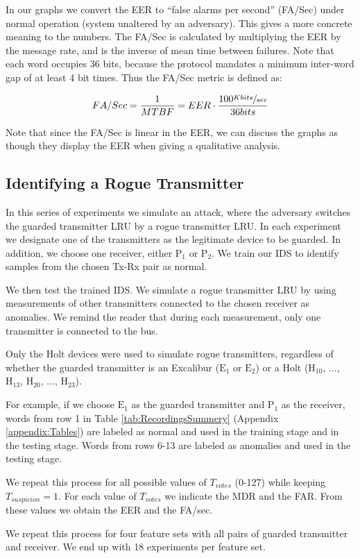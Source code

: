\documentclass[english]{llncs}
\newcommand{\sublevel}[1]{\subsection{#1}}
\newcommand{\sublevel}[1]{\section{#1}}
\begin{document}
  In our graphs we convert the EER to ``false alarms per second'' (FA/Sec) under normal operation (system unaltered by an adversary). This gives a more concrete meaning to the numbers. The FA/Sec is calculated by multiplying the EER by the message rate, and is the inverse of mean time between failures. Note that each word occupies 36 bits, because the protocol mandates a minimum inter-word gap of at least 4 bit times. Thus the FA/Sec metric is defined as:
  
  \[FA/Sec = \frac{1}{MTBF} = EER \cdot \frac{100 \sfrac{Kbits}{sec}}{36bits}\]
  
  Note that since the FA/Sec is linear in the EER, we can discuss the graphs as though they display the EER when giving a qualitative analysis.
  
\sublevel{Identifying a Rogue Transmitter}
  In this series of experiments we simulate an attack, where the adversary switches the guarded transmitter LRU by a rogue transmitter LRU. In each experiment we designate one of the transmitters as the legitimate device to be guarded. In addition, we choose one receiver, either \(\text{P}_1\) or \(\text{P}_2\).  We train our IDS to identify samples from the chosen Tx-Rx pair as normal.
  
  We then test the trained IDS. We simulate a rogue transmitter LRU by using measurements of other transmitters connected to the chosen receiver as anomalies. We remind the reader that during each measurement, only one transmitter is connected to the bus.
  
  Only the Holt devices were used to simulate rogue transmitters, regardless of whether the guarded transmitter is an Excalibur (\(\text{E}_1\) or \(\text{E}_2\)) or a Holt (\(\text{H}_{10}\), ..., \(\text{H}_{13}\), \(\text{H}_{20}\), ..., \(\text{H}_{23}\)).
  
  For example, if we choose \(\text{E}_1\) as the guarded transmitter and \(\text{P}_1\) as the receiver, words from row 1 in Table \ref{tab:RecordingsSummery} (Appendix \ref{appendix:Tables}) are labeled as normal and used in the training stage and in the testing stage. Words from rows 6-13 are labeled as anomalies and used in the testing stage.
  
  We repeat this process for all possible values of $T_{votes}$ (0-127) while keeping $T_{suspicion} = 1$. For each value of $T_{votes}$ we indicate the MDR and the FAR. From these values we obtain the EER and the FA/sec.
  
  We repeat this process for four feature sets with all pairs of guarded transmitter and receiver. We end up with 18 experiments per feature set.
  
\end{document}
